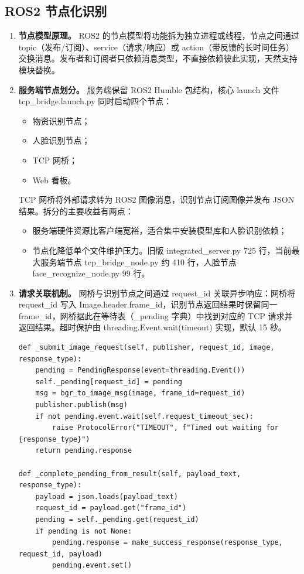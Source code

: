 \documentclass[12pt]{article}
\newcommand{\code}[1]{{\ttfamily #1}}
\begin{document}
\subsection{ROS2 节点化识别}

\begin{enumerate}
	\item \textbf{节点模型原理。} ROS2 的节点模型将功能拆为独立进程或线程，节点之间通过 topic（发布/订阅）、service（请求/响应）或 action（带反馈的长时间任务）交换消息。发布者和订阅者只依赖消息类型，不直接依赖彼此实现，天然支持模块替换。

	\item \textbf{服务端节点划分。} 服务端保留 ROS2 Humble 包结构，核心 launch 文件 \code{tcp\_bridge.launch.py} 同时启动四个节点：

	      \begin{itemize}
		      \item 物资识别节点；
		      \item 人脸识别节点；
		      \item TCP 网桥；
		      \item Web 看板。
	      \end{itemize}

	      TCP 网桥将外部请求转为 ROS2 图像消息，识别节点订阅图像并发布 JSON 结果。拆分的主要收益有两点：

	      \begin{itemize}
		      \item 服务端硬件资源比客户端宽裕，适合集中安装模型库和人脸识别依赖；
		      \item 节点化降低单个文件维护压力。旧版 \code{integrated\_server.py} 725 行，当前最大服务端节点 \code{tcp\_bridge\_node.py} 约 410 行，人脸节点 \code{face\_recognize\_node.py} 99 行。
	      \end{itemize}

	\item \textbf{请求关联机制。} 网桥与识别节点之间通过 \code{request\_id} 关联异步响应：网桥将 \code{request\_id} 写入 \code{Image.header.frame\_id}，识别节点返回结果时保留同一 \code{frame\_id}，网桥据此在等待表（\code{\_pending} 字典）中找到对应的 TCP 请求并返回结果。超时保护由 \code{threading.Event.wait(timeout)} 实现，默认 15 秒。

	      \begin{lstlisting}[caption={网桥请求等待与结果回调},label={lst:ros2-bridge}]
def _submit_image_request(self, publisher, request_id, image, response_type):
    pending = PendingResponse(event=threading.Event())
    self._pending[request_id] = pending
    msg = bgr_to_image_msg(image, frame_id=request_id)
    publisher.publish(msg)
    if not pending.event.wait(self.request_timeout_sec):
        raise ProtocolError("TIMEOUT", f"Timed out waiting for {response_type}")
    return pending.response

def _complete_pending_from_result(self, payload_text, response_type):
    payload = json.loads(payload_text)
    request_id = payload.get("frame_id")
    pending = self._pending.get(request_id)
    if pending is not None:
        pending.response = make_success_response(response_type, request_id, payload)
        pending.event.set()
\end{lstlisting}
\end{enumerate}
\end{document}
